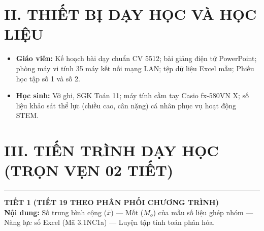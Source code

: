 \documentclass[12pt, a4paper]{article}
\begin{document}
\section*{II. THIẾT BỊ DẠY HỌC VÀ HỌC LIỆU}
\begin{itemize}[leftmargin=1.5em]
    \item \textbf{Giáo viên:} Kế hoạch bài dạy chuẩn CV 5512; bài giảng điện tử PowerPoint; phòng máy vi tính 35 máy kết nối mạng LAN; tệp dữ liệu Excel mẫu; Phiếu học tập số 1 và số 2.
    \item \textbf{Học sinh:} Vở ghi, SGK Toán 11; máy tính cầm tay Casio fx-580VN X; số liệu khảo sát thể lực (chiều cao, cân nặng) cá nhân phục vụ hoạt động STEM.
\end{itemize}

\section*{III. TIẾN TRÌNH DẠY HỌC (TRỌN VẸN 02 TIẾT)}

\begin{center}
\end{center}

\vspace{0.8em}
\hrule
\vspace{0.8em}

{\large \textbf{TIẾT 1 (TIẾT 19 THEO PHÂN PHỐI CHƯƠNG TRÌNH)}}\\[0.3em]
\textbf{Nội dung:} Số trung bình cộng ($\overline{x}$) --- Mốt ($M_o$) của mẫu số liệu ghép nhóm --- Năng lực số Excel (Mã 3.1NC1a) --- Luyện tập tính toán phân hóa.
\end{document}
